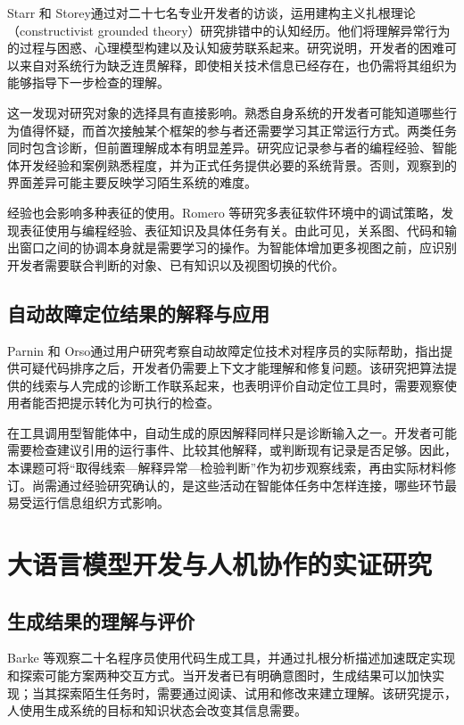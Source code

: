 Starr 和 Storey\cite{ref16}通过对二十七名专业开发者的访谈，运用建构主义扎根理论（constructivist grounded theory）研究排错中的认知经历。他们将理解异常行为的过程与困惑、心理模型构建以及认知疲劳联系起来。研究说明，开发者的困难可以来自对系统行为缺乏连贯解释，即使相关技术信息已经存在，也仍需将其组织为能够指导下一步检查的理解。

这一发现对研究对象的选择具有直接影响。熟悉自身系统的开发者可能知道哪些行为值得怀疑，而首次接触某个框架的参与者还需要学习其正常运行方式。两类任务同时包含诊断，但前置理解成本有明显差异。研究应记录参与者的编程经验、智能体开发经验和案例熟悉程度，并为正式任务提供必要的系统背景。否则，观察到的界面差异可能主要反映学习陌生系统的难度。

经验也会影响多种表征的使用。Romero 等\cite{ref34}研究多表征软件环境中的调试策略，发现表征使用与编程经验、表征知识及具体任务有关。由此可见，关系图、代码和输出窗口之间的协调本身就是需要学习的操作。为智能体增加更多视图之前，应识别开发者需要联合判断的对象、已有知识以及视图切换的代价。

\subsection{自动故障定位结果的解释与应用}

Parnin 和 Orso\cite{ref35}通过用户研究考察自动故障定位技术对程序员的实际帮助，指出提供可疑代码排序之后，开发者仍需要上下文才能理解和修复问题。该研究把算法提供的线索与人完成的诊断工作联系起来，也表明评价自动定位工具时，需要观察使用者能否把提示转化为可执行的检查。

在工具调用型智能体中，自动生成的原因解释同样只是诊断输入之一。开发者可能需要检查建议引用的运行事件、比较其他解释，或判断现有记录是否足够。因此，本课题可将“取得线索—解释异常—检验判断”作为初步观察线索，再由实际材料修订。尚需通过经验研究确认的，是这些活动在智能体任务中怎样连接，哪些环节最易受运行信息组织方式影响。

\section{大语言模型开发与人机协作的实证研究}

\subsection{生成结果的理解与评价}

Barke 等\cite{ref64}观察二十名程序员使用代码生成工具，并通过扎根分析描述加速既定实现和探索可能方案两种交互方式。当开发者已有明确意图时，生成结果可以加快实现；当其探索陌生任务时，需要通过阅读、试用和修改来建立理解。该研究提示，人使用生成系统的目标和知识状态会改变其信息需要。

